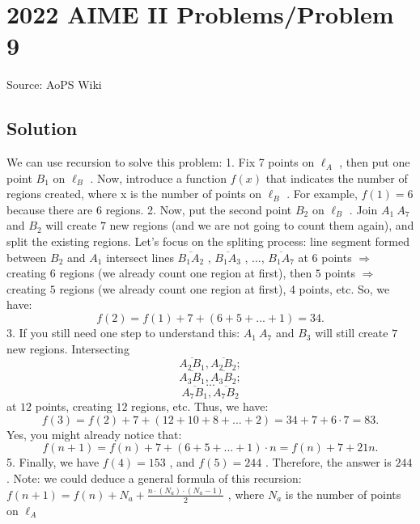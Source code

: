\documentclass[12pt]{article}
\begin{document}
\section*{{2022 AIME II Problems/Problem 9}}
Source: AoPS Wiki

\subsection*{Solution}
We can use recursion to solve this problem: 1. Fix 7 points on $\ell_A$ , then put one point $B_1$ on $\ell_B$ . Now, introduce a function $f(x)$ that indicates the number of regions created, where x is the number of points on $\ell_B$ . For example, $f(1) = 6$ because there are 6 regions. 2. Now, put the second point $B_2$ on $\ell_B$ . Join $A_1~A_7$ and $B_2$ will create $7$ new regions (and we are not going to count them again), and split the existing regions. Let's focus on the spliting process: line segment formed between $B_2$ and $A_1$ intersect lines $\overline{B_1A_2}$ , $\overline{B_1A_3}$ , ..., $\overline{B_1A_7}$ at $6$ points $\Longrightarrow$ creating $6$ regions (we already count one region at first), then $5$ points $\Longrightarrow$ creating $5$ regions (we already count one region at first), 4 points, etc. So, we have: \[f(2) = f(1) + 7 + (6+5+...+1) = 34.\] 3. If you still need one step to understand this: $A_1~A_7$ and $B_3$ will still create $7$ new regions. Intersecting \[\overline{A_2B_1}, \overline{A_2B_2};\] \[\overline{A_3B_1}, \overline{A_3B_2};\] \[...\] \[\overline{A_7B_1}, \overline{A_7B_2}\] at $12$ points, creating $12$ regions, etc. Thus, we have: \[f(3) = f(2)+7+(12+10+8+...+2)=34+7+6\cdot 7=83.\] Yes, you might already notice that: \[f(n+1) = f(n)+7+(6+5+...+1)\cdot n = f(n) + 7 + 21n.\] 5. Finally, we have $f(4) = 153$ , and $f(5)=244$ . Therefore, the answer is $\boxed{244}$ . Note: we could deduce a general formula of this recursion: $f(n+1)=f(n)+N_a+\frac{n\cdot (N_a) \cdot (N_a-1)}{2}$ , where $N_a$ is the number of points on $\ell_A$
\end{document}
